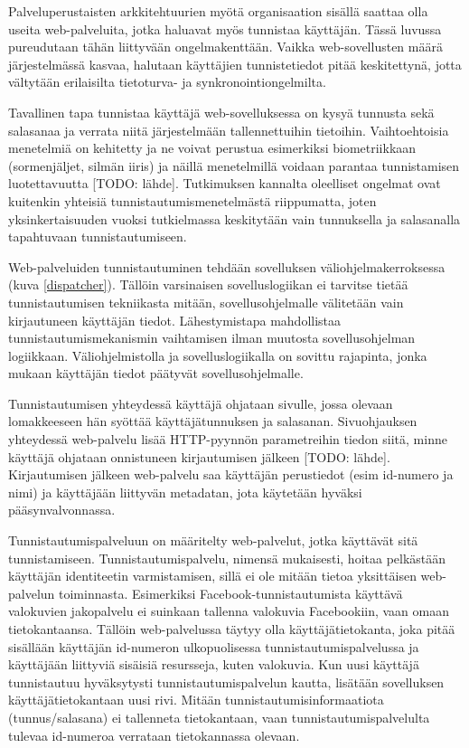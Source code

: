 Palveluperustaisten arkkitehtuurien myötä organisaation sisällä saattaa olla useita web-palveluita, jotka haluavat myös tunnistaa käyttäjän. Tässä luvussa pureudutaan tähän liittyvään ongelmakenttään. Vaikka web-sovellusten määrä järjestelmässä kasvaa, halutaan käyttäjien tunnistetiedot pitää keskitettynä, jotta vältytään erilaisilta tietoturva- ja synkronointiongelmilta.

Tavallinen tapa tunnistaa käyttäjä web-sovelluksessa on kysyä tunnusta sekä salasanaa ja verrata niitä järjestelmään tallennettuihin tietoihin. Vaihtoehtoisia menetelmiä on kehitetty ja ne voivat perustua esimerkiksi biometriikkaan (sormenjäljet, silmän iiris) ja näillä menetelmillä voidaan parantaa tunnistamisen luotettavuutta [TODO: lähde]. Tutkimuksen kannalta oleelliset ongelmat ovat kuitenkin yhteisiä tunnistautumismenetelmästä riippumatta, joten yksinkertaisuuden vuoksi tutkielmassa keskitytään vain tunnuksella ja salasanalla tapahtuvaan tunnistautumiseen.

Web-palveluiden tunnistautuminen tehdään sovelluksen väliohjelmakerroksessa (kuva \ref{dispatcher}). Tällöin varsinaisen sovelluslogiikan ei tarvitse tietää tunnistautumisen tekniikasta mitään, sovellusohjelmalle välitetään vain kirjautuneen käyttäjän tiedot. Lähestymistapa mahdollistaa tunnistautumismekanismin vaihtamisen ilman muutosta sovellusohjelman logiikkaan. Väliohjelmistolla ja sovelluslogiikalla on sovittu rajapinta, jonka mukaan käyttäjän tiedot päätyvät sovellusohjelmalle.

Tunnistautumisen yhteydessä käyttäjä ohjataan sivulle, jossa olevaan lomakkeeseen hän syöttää käyttäjätunnuksen ja salasanan. Sivuohjauksen yhteydessä web-palvelu lisää HTTP-pyynnön parametreihin tiedon siitä, minne käyttäjä ohjataan onnistuneen kirjautumisen jälkeen [TODO: lähde]. Kirjautumisen jälkeen web-palvelu saa käyttäjän perustiedot (esim id-numero ja nimi) ja käyttäjään liittyvän metadatan, jota käytetään hyväksi pääsynvalvonnassa.

Tunnistautumispalveluun on määritelty web-palvelut, jotka käyttävät sitä tunnistamiseen. Tunnistautumispalvelu, nimensä mukaisesti, hoitaa pelkästään käyttäjän identiteetin varmistamisen, sillä ei ole mitään tietoa yksittäisen web-palvelun toiminnasta. Esimerkiksi Facebook-tunnistautumista käyttävä valokuvien jakopalvelu ei suinkaan tallenna valokuvia Facebookiin, vaan omaan tietokantaansa. Tällöin web-palvelussa täytyy olla käyttäjätietokanta, joka pitää sisällään käyttäjän id-numeron ulkopuolisessa tunnistautumispalvelussa ja käyttäjään liittyviä sisäisiä resursseja, kuten valokuvia. Kun uusi käyttäjä tunnistautuu hyväksytysti tunnistautumispalvelun kautta, lisätään sovelluksen käyttäjätietokantaan uusi rivi. Mitään tunnistautumisinformaatiota (tunnus/salasana) ei tallenneta tietokantaan, vaan tunnistautumispalvelulta tulevaa id-numeroa verrataan tietokannassa olevaan.

